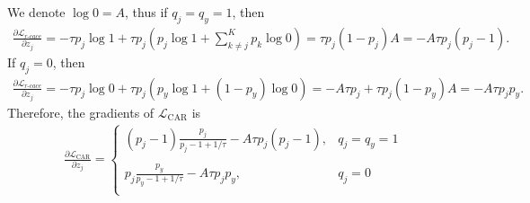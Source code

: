 \documentclass{article}
\begin{document}
We denote $\log0 = A$, thus if $q_{j}=q_{y}=1$, then
\begin{align}
	\frac{\partial \mathcal{L}_{r\textrm{-}cace}}{\partial z_{j}}=-\tau p_{j}\log1+\tau p_{j}(p_{j}\log1+\sum_{k\ne j}^{K}p_{k}\log0)=\tau p_{j}(1-p_{j})A=-A\tau p_{j}(p_{j}-1).
\end{align}
If $q_{j}=0$, then
\begin{align}
	\frac{\partial \mathcal{L}_{r\textrm{-}cace}}{\partial z_{j}}=-\tau p_{j}\log0+\tau p_{j}(p_{y}\log1 + (1-p_{y})\log0 ) = -A\tau p_{j}+\tau p_{j}(1-p_{y})A=-A\tau p_{j}p_{y}. 
\end{align}
Therefore, the gradients of $\mathcal{L}_\textrm{CAR}$ is
\begin{align}
	\frac{\partial \mathcal{L}_\textrm{CAR}}{\partial z_{j}}=\left\{ \begin{array}{ll}
		(p_{j}-1) \frac{ p_{j}}{p_{j}-1 +1/\tau}-A\tau p_{j}(p_{j}-1) , & q_{j}=q_{y}=1\\\\
		p_{j}\frac{p_{y}}{p_{y}-1+1/\tau}-A\tau p_{j}p_{y} , & q_{j}=0  \\
	\end{array} \right.
\end{align}
\end{document}
